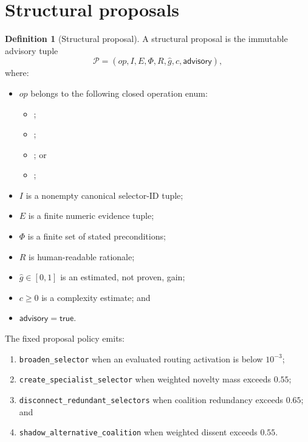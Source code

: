 \documentclass[11pt]{article}
\theoremstyle{definition}
\newtheorem{definition}{Definition}[section]
\theoremstyle{plain}
\begin{document}
\section{Structural proposals}

\begin{definition}[Structural proposal]
A structural proposal is the immutable advisory tuple
\[
\mathcal P=(op,I,E,\Phi,R,\widehat g,c,\mathsf{advisory}),
\]
where:
\begin{itemize}[leftmargin=*,itemsep=1pt]
  \item $op$ belongs to the following closed operation enum:
  \begin{itemize}[leftmargin=6mm,nosep]
    \item {};
    \item {};
    \item {}; or
    \item {};
  \end{itemize}
  \item $I$ is a nonempty canonical selector-ID tuple;
  \item $E$ is a finite numeric evidence tuple;
  \item $\Phi$ is a finite set of stated preconditions;
  \item $R$ is human-readable rationale;
  \item $\widehat g\in[0,1]$ is an estimated, not proven, gain;
  \item $c\ge0$ is a complexity estimate; and
  \item $\mathsf{advisory}=\mathsf{true}$.
\end{itemize}
\end{definition}

The fixed proposal policy emits:
\begin{enumerate}[leftmargin=*,itemsep=1pt]
  \item \texttt{broaden\_selector} when an evaluated routing activation is
  below $10^{-3}$;
  \item \texttt{create\_specialist\_selector} when weighted novelty mass
  exceeds $0.55$;
  \item \texttt{disconnect\_redundant\_selectors} when coalition redundancy
  exceeds $0.65$; and
  \item \texttt{shadow\_alternative\_coalition} when weighted dissent exceeds
  $0.55$.
\end{enumerate}
\end{document}
